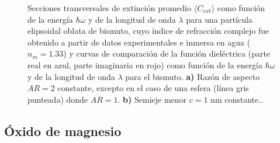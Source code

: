 \begin{figure}[H]
	\quad%
	\caption{Secciones transversales de extinción promedio $\langle C_{ext}\rangle$ como función de la energía $\hbar\omega$ y de la longitud de onda $\lambda$ para una partícula elipsoidal oblata de bismuto, cuyo índice de refracción complejo fue obtenido a partir de datos experimentales  e inmersa en agua ($n_m=1.33$) y curvas de comparación de la función dieléctrica (parte real en azul, parte imaginaria en rojo) como función de la energía $\hbar\omega$ y de la longitud de onda $\lambda$ para el bismuto. \textbf{a)} Razón de aspecto $AR=2$ constante, excepto en el caso de una esfera (línea gris punteada) donde $AR=1$. \textbf{b)} Semieje menor $c=1$ nm constante..}\label{fig:test}
\end{figure}


\subsection*{Óxido de magnesio}







